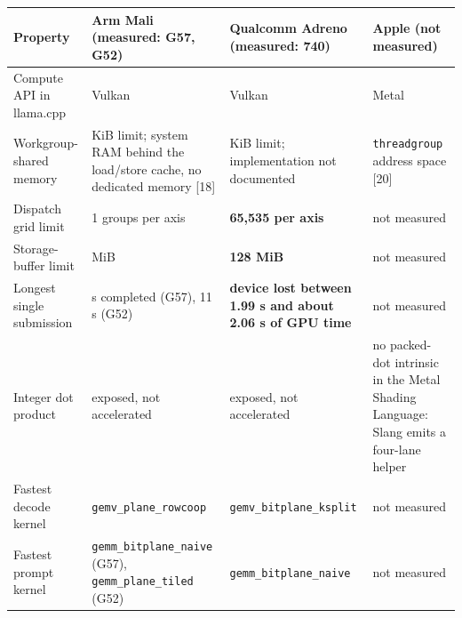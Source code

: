\documentclass[
  10pt,
]{article}
\newcounter{none} %
\begin{document}
{\def\LTcaptype{none} %
\begin{longtable}[]{@{}
  >{\raggedright\arraybackslash}p{}
  >{\raggedright\arraybackslash}p{}
  >{\raggedright\arraybackslash}p{}
  >{\raggedright\arraybackslash}p{}@{}}
\toprule\noalign{}
\begin{minipage}[b]{\linewidth}\raggedright%
Property
\end{minipage} & \begin{minipage}[b]{\linewidth}\raggedright%
Arm Mali (measured: G57, G52)
\end{minipage} & \begin{minipage}[b]{\linewidth}\raggedright%
Qualcomm Adreno (measured: 740)
\end{minipage} & \begin{minipage}[b]{\linewidth}\raggedright%
Apple (not measured)
\end{minipage} \\
\midrule\noalign{}
\endhead%
\bottomrule\noalign{}
\endlastfoot%
Compute API in llama.cpp & Vulkan & Vulkan & Metal \\
Workgroup-shared memory & 32 KiB limit; system RAM behind the load/store
cache, no dedicated memory [18] & 32 KiB limit; implementation not
documented & \texttt{threadgroup} address space [20] \\
Dispatch grid limit & 2\textthreesuperior{}\texttwosuperior{}\textminus{}1 groups per axis & \textbf{65,535 per axis} &
not measured \\
Storage-buffer limit & 256 MiB & \textbf{128 MiB} & not measured \\
Longest single submission & 32 s completed (G57), 11 s (G52) &
\textbf{device lost between 1.99 s and about 2.06 s of GPU time} & not
measured \\
Integer dot product & exposed, not accelerated & exposed, not
accelerated & no packed-dot intrinsic in the Metal Shading Language:
Slang emits a four-lane helper \\
Fastest decode kernel & \texttt{gemv\_plane\_rowcoop} &
\texttt{gemv\_bitplane\_ksplit} & not measured \\
Fastest prompt kernel & \texttt{gemm\_bitplane\_naive} (G57),
\texttt{gemm\_plane\_tiled} (G52) & \texttt{gemm\_bitplane\_naive} & not
measured \\
\end{longtable}
}
\end{document}
